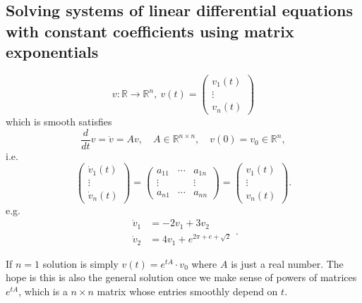\documentclass[a4paper]{article}
\theoremstyle{definition}
\begin{document}
\subsection{Solving systems of linear differential equations with constant coefficients using matrix exponentials}
\[
v:\mathbb R \rightarrow \mathbb R^n,\ v(t)=\begin{pmatrix}v_1(t)\\ \vdots \\ v_n(t) \end{pmatrix}
\]
which is smooth satisfies
\[
\frac{d}{dt}v=\dot v = Av,\quad A\in \mathbb R^{n\times n},\quad v(0)=v_0\in \mathbb R^n ,
\]
i.e.
\[
\begin{pmatrix}\dot v_1(t)\\ \vdots \\ \dot v_n(t) \end{pmatrix}=\begin{pmatrix}a_{11}&\cdots & a_{1n}\\ \vdots & & \vdots \\ a_{n1} & \cdots & a_{nn}\end{pmatrix}=\begin{pmatrix}v_1(t)\\ \vdots \\ v_n(t) \end{pmatrix} .
\]
e.g.
\[
\begin{aligned}\dot v_1 &=-2v_1+3v_2\\ \dot v_2 &= 4v_1+e^{2\pi+ e+\sqrt 2} \end{aligned} .
\]

If $n=1$ solution is simply $v(t)=e^{tA}\cdot v_0$ where $A$ is just a real number. The hope is this is also the general solution once we make sense of powers of matrices $e^{tA}$, which is a $n\times n$ matrix whose entries smoothly depend on $t$.
\end{document}
